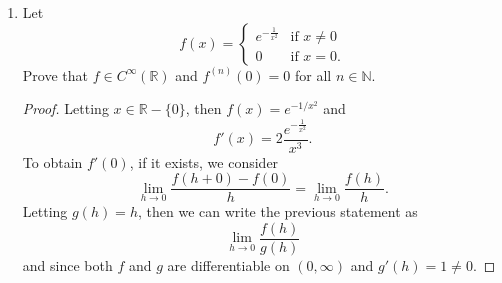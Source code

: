 \documentclass[12pt]{article}
\begin{document}
\begin{enumerate}
\begin{proof}
                This contradicts that $|f'(x)|<1$ for all $x\in\mathbb{R}$.
                Therefore $x$ must be unique. 
            \end{proof}
        \item Let 
            \begin{equation*}
                f(x)=\begin{cases}
                    e^{-\frac{1}{x^2}} &\text{if $x\neq 0$} \\
                    0 &\text{if $x=0$}.
                \end{cases}
            \end{equation*}
            Prove that $f\in C^{\infty}(\mathbb{R})$ and $f^{(n)}(0)=0$ for all
            $n\in\mathbb{N}$. 
            \begin{proof}
                Letting $x\in\mathbb{R}-\{0\}$, then $f(x)=e^{-1/x^2}$ and 
                \begin{equation*}
                    f'(x)=2\frac{e^{-\frac{1}{x^2}}}{x^3}.
                \end{equation*}
                To obtain $f'(0)$, if it exists, we consider
                \begin{equation*}
                    \lim_{h\to 0}\frac{f(h+0)-f(0)}{h}=\lim_{h\to
                    0}\frac{f(h)}{h}.
                \end{equation*}
                Letting $g(h) = h$, then we can write the previous statement
                as
                \begin{equation*}
                    \lim_{h\to 0}\frac{f(h)}{g(h)}
                \end{equation*}
                and since both $f$ and $g$ are differentiable on $(0, \infty)$
                and $g'(h)=1\neq 0$. 
            \end{proof}
    \end{enumerate}
\end{document}
